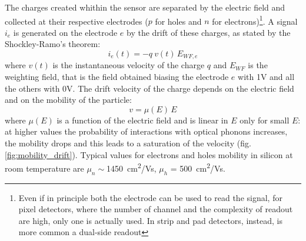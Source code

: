    The charges created whithin the sensor are separated by the electric field and collected at their respective electrodes ($p$ for holes and $n$ for electrons)\footnote{Even if in principle both the electrode can be used to read the signal, for pixel detectors, where the number of channel and the complexity of readout are high, only one is actually used. In strip and pad detectors, instead, is more common a dual-side readout}. A signal $i_e$ is generated on the electrode $e$  by the drift of these charges, as stated by the Shockley-Ramo's theorem: 
   \begin{equation}
        i_e(t) = -q\: v(t)\, E_{WF,e}
   \end{equation}
   where $v(t)$ is the instantaneous velocity of the charge $q$ and $E_{WF}$ is the weighting field, that is the field obtained biasing the electrode $e$ with 1V and all the others with 0V. The drift velocity of the charge depends on the electric field and on the mobility of the particle:
   \begin{equation}
      v = \mu(E)\, E
   \end{equation}
   where $\mu(E)$ is a function of the electric field and is linear in $E$ only for small $E$: at higher values the probability of interactions with optical phonons increases, the mobility drops and this leads to a saturation of the velocity (fig. \ref{fig:mobility_drift}). Typical values for electrons and holes mobility in silicon at room temperature are $\mu _n \sim$\SI{1450}{cm\squared/Vs}, $\mu _h$ = \SI{500}{cm\squared/Vs}.
